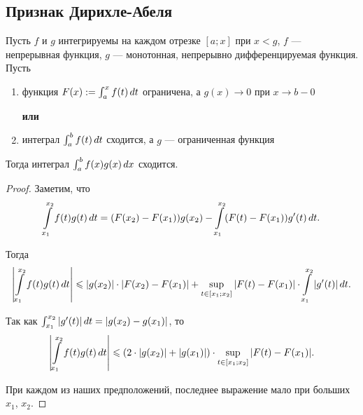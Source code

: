 \documentclass[a4paper]{article}
\theoremstyle{named}
\renewcommand{\int}{\intop}
\begin{document}
        \subsection{Признак Дирихле-Абеля}

        \begin{theorem*}
            Пусть $f$ и $g$ интегрируемы на каждом отрезке $[a; x]$ при $x < g$, $f$ --- непрерывная функция, $g$ --- монотонная, непрерывно дифференцируемая функция. Пусть
            \begin{enumerate}
            \item
                функция $F(x) := \int_a^x f(t) \dd t$ ограничена, а $g(x) \to 0$ при $x \to b - 0$

            \textbf{или}

            \item
                интеграл $\int_a^b f(t) \dd t$ сходится, а $g$ --- ограниченная функция
            \end{enumerate}

            Тогда интеграл $\int_a^b f(x)g(x) \dd x$ сходится.
        \end{theorem*}

        \begin{proof}
            Заметим, что
            \begin{equation*}
                \int_{x_1}^{x_2} f(t) g(t) \dd t = (F(x_2) - F(x_1))g(x_2) - \int_{x_1}^{x_2} (F(t) - F(x_1))g'(t) \dd t.
            \end{equation*}

            Тогда
            \begin{equation*}
                \left|\int_{x_1}^{x_2} f(t) g(t) \dd t\right| \leq |g(x_2)| \cdot |F(x_2) - F(x_1)| + \sup\limits_{t \in [x_1; x_2]} |F(t) - F(x_1)| \cdot \int_{x_1}^{x_2} |g'(t)| \dd t.
            \end{equation*}

            Так как $\int_{x_1}^{x_2} |g'(t)| \dd t = |g(x_2) - g(x_1)|$, то
            \begin{equation*}
                \left|\int_{x_1}^{x_2} f(t) g(t) \dd t\right| \leq (2 \cdot |g(x_2)| + |g(x_1)|) \cdot \sup\limits_{t \in [x_1; x_2]} |F(t) - F(x_1)|.
            \end{equation*}

            При каждом из наших предположений, последнее выражение мало при больших $x_1$, $x_2$.
        \end{proof}
\end{document}
